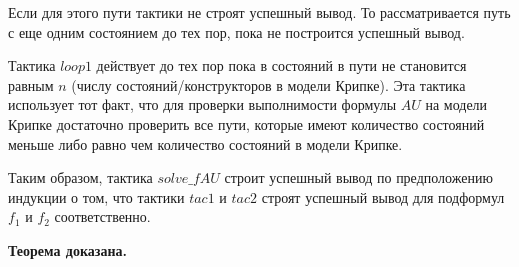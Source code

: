 \documentclass[12pt]{article}
\begin{document}
Если для этого пути тактики не строят успешный вывод. То рассматривается путь с еще одним состоянием до тех пор, пока не построится успешный вывод.


Тактика $loop1$ действует до тех пор пока в состояний в пути не становится равным $n$ (числу состояний/конструкторов в модели Крипке). Эта тактика использует тот факт, что для проверки выполнимости формулы $AU$ на модели Крипке достаточно проверить все пути, которые имеют количество состояний меньше либо равно чем количество состояний в модели Крипке\cite{Karpov}.

Таким образом, тактика $solve\_fAU$ строит успешный вывод по предположению индукции о том, что тактики $tac1$ и $tac2$ строят успешный вывод для подформул $f_1$ и $f_2$ соответственно.








\textbf{Теорема доказана.}
\end{document}
